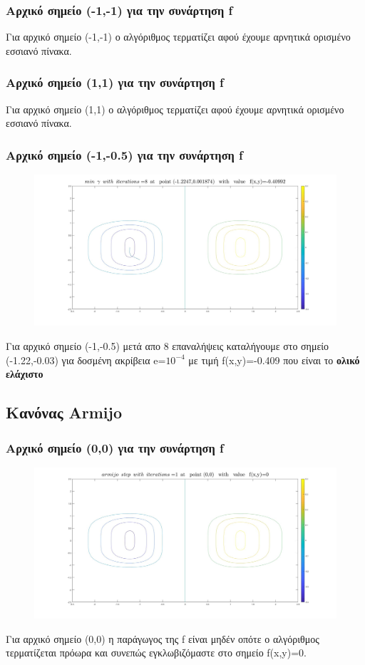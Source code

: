 \documentclass{article}
\begin{document}
 \subsubsection*{Αρχικό σημείο (-1,-1) για την συνάρτηση f}
Για αρχικό σημείο (-1,-1) ο αλγόριθμος τερματίζει αφού έχουμε αρνητικά ορισμένο εσσιανό πίνακα. 
 
\subsubsection*{Αρχικό σημείο (1,1) για την συνάρτηση f}
  
Για αρχικό σημείο (1,1) ο αλγόριθμος τερματίζει αφού έχουμε αρνητικά ορισμένο εσσιανό πίνακα. 
\clearpage
\subsubsection*{Αρχικό σημείο (-1,-0.5) για την συνάρτηση f}
\begin{figure}[h!]	
     \centering  
     \advance\leftskip-0.2cm    \includegraphics[width=140mm,scale=2]{mn2.jpg}
\end{figure} 
Για αρχικό σημείο (-1,-0.5) μετά απο 8 επαναλήψεις καταλήγουμε στο σημείο (-1.22,-0.03) για  δοσμένη ακρίβεια e=$10^{-4}$ με τιμή f(x,y)=-0.409 που είναι  το \textbf{ολικό ελάχιστο} \clearpage
 \subsection*{Κανόνας Armijo}
\subsubsection*{Αρχικό σημείο (0,0) για την συνάρτηση f}
\begin{figure}[h!]	
     \centering  
     \advance\leftskip-0.2cm  
  \includegraphics[width=130mm,scale=2]{arm1.jpg}
\end{figure} 
Για αρχικό σημείο (0,0) η παράγωγος της f είναι μηδέν οπότε ο αλγόριθμος τερματίζεται πρόωρα και συνεπώς εγκλωβιζόμαστε στο σημείο f(x,y)=0.
\end{document}
